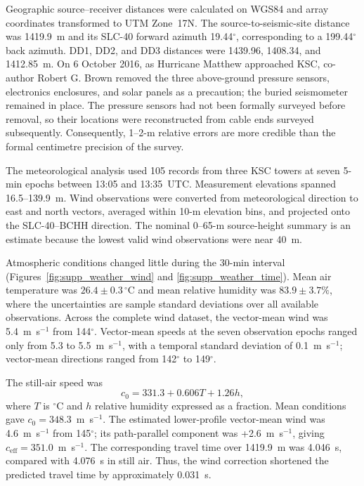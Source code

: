 \documentclass[]{seismica}
\begin{document}
Geographic source--receiver distances were calculated on WGS84 and array
coordinates transformed to UTM Zone~17N. The source-to-seismic-site distance
was 1419.9~m and its SLC-40 forward azimuth 19.44$^\circ$, corresponding to a
199.44$^\circ$ back azimuth. DD1, DD2, and DD3 distances were 1439.96,
1408.34, and 1412.85~m. On 6 October 2016, as Hurricane Matthew approached
KSC, co-author Robert G. Brown removed the three above-ground pressure sensors,
electronics enclosures, and solar panels as a precaution; the buried
seismometer remained in place. The pressure sensors had not been formally
surveyed before removal, so their locations were reconstructed from cable ends
surveyed subsequently. Consequently, 1--2-m relative errors are more credible
than the formal centimetre precision of the survey.

The meteorological analysis used 105 records from three KSC towers at seven
5-min epochs between 13:05 and 13:35~UTC. Measurement elevations spanned
16.5--139.9~m. Wind observations were converted from meteorological direction
to east and north vectors, averaged within 10-m elevation bins, and projected
onto the SLC-40--BCHH direction. The nominal 0--65-m source-height summary is
an estimate because the lowest valid wind observations were near 40~m.

Atmospheric conditions changed little during the 30-min interval
(Figures~\ref{fig:supp_weather_wind} and
\ref{fig:supp_weather_time}). Mean air temperature was
$26.4\pm0.3\,^{\circ}$C and mean relative humidity was
$83.9\pm3.7\%$, where the uncertainties are sample standard deviations over
all available observations. Across the complete wind dataset, the vector-mean
wind was 5.4~m~s$^{-1}$ from 144$^\circ$. Vector-mean speeds at the seven
observation epochs ranged only from 5.3 to 5.5~m~s$^{-1}$, with a temporal
standard deviation of 0.1~m~s$^{-1}$; vector-mean directions ranged from
142$^\circ$ to 149$^\circ$.

The still-air speed was
\begin{equation}
 c_0=331.3+0.606T+1.26h,
\end{equation}
where $T$ is $^\circ$C and $h$ relative humidity expressed as a fraction. Mean
conditions gave $c_0=348.3$~m~s$^{-1}$. The estimated lower-profile
vector-mean wind was 4.6~m~s$^{-1}$ from 145$^\circ$; its path-parallel
component was +2.6~m~s$^{-1}$, giving
$c_{\mathrm{eff}}=351.0$~m~s$^{-1}$. The corresponding travel time over
1419.9~m was 4.046~s, compared with 4.076~s in still air. Thus, the wind
correction shortened the predicted travel time by approximately 0.031~s.
\end{document}

